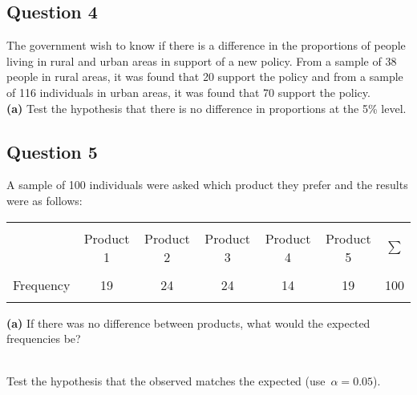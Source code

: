 \documentclass[a4paper,12pt]{article}
\begin{document}
\subsection*{Question 4}
The government wish to know if there is a difference in the proportions of people living in rural and urban areas in support of a new policy. From a sample of 38 people in rural areas, it was found that 20 support the policy and from a sample of 116 individuals in urban areas, it was found that 70 support the policy. \\

{\bf(a)} Test the hypothesis that there is no difference in proportions at the 5\% level.



\subsection*{Question 5}
A sample of 100 individuals were asked which product they prefer and the results were as follows:  \\
\begin{center}
\begin{tabular}{|c|ccccc|c|}
\hline
&&&&&&\\
 & Product 1 & Product 2 & Product 3 & Product 4 & Product 5 & $\sum$ \\[0.1cm]
\hline
&&&&&&\\
Frequency & 19 & 24 & 24 & 14 & 19 & 100\\[0.1cm]
\hline
\multicolumn{7}{c}{}\\
\end{tabular}
\end{center}

{\bf(a)} If there was no difference between products, what would the expected frequencies be? 
 
\item \\ Test the hypothesis that the observed matches the expected \mbox{(use $\alpha=0.05$)}.
\end{document}
